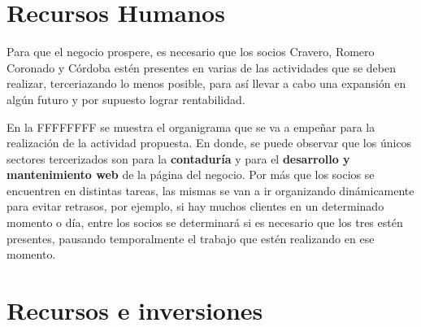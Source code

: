 \documentclass[11pt,a4paper]{article}
\begin{document}

\section{Recursos Humanos}

Para que el negocio prospere, es necesario que los socios Cravero, Romero Coronado y Córdoba estén presentes en varias de las actividades que se deben realizar, terceriazando lo menos posible, para así llevar a cabo una expansión en algún futuro y por supuesto lograr rentabilidad.

En la FFFFFFFF se muestra el organigrama que se va a empeñar para la realización de la actividad propuesta. En donde, se puede observar que los únicos sectores tercerizados son para la \textbf{contaduría} y para el \textbf{desarrollo y mantenimiento web} de la página del negocio. Por más que los socios se encuentren en distintas tareas, las mismas se van a ir organizando dinámicamente para evitar retrasos, por ejemplo, si hay muchos clientes en un determinado momento o día, entre los socios se determinará si es necesario que los tres estén presentes, pausando temporalmente el trabajo que estén realizando en ese momento.



\section{Recursos e inversiones}

\end{document}
